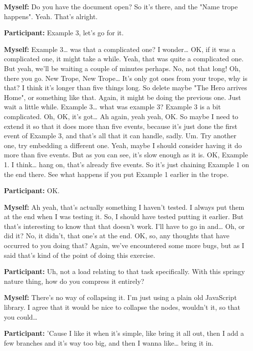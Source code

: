 \documentclass[11pt]{report}
\newcommand{\llabel}[1]{\hypertarget{llineno:#1}{\linelabel{#1}}}
\begin{document}
\begin{linenumbers}
\textbf{Myself:} Do you have the document open? So it's there, and the "Name trope happens". Yeah. That's alright.

\textbf{Participant:} Example 3, let's go for it.

\textbf{Myself:} Example 3\ldots{} was that a complicated one? I wonder\ldots{} OK, if it was a complicated one, it might take a while. Yeah, that was quite a complicated one. But yeah, we'll be waiting a couple of minutes perhaps. No, not that long! Oh, there you go. New Trope, New Trope\ldots{} It's only got ones from your trope, why is that? I think it's longer than five things long. So delete maybe "The Hero arrives Home", or something like that. Again, it might be doing the previous one. Just wait a little while. Example 3\ldots{} what was example 3? Example 3 is a bit complicated. Oh, OK, it's got\ldots{} Ah again, yeah yeah, OK. So maybe I need to extend it so that it does more than five events, because it's just done the first event of Example 3, and that's all that it can handle, sadly. Um. Try another one, try embedding a different one. Yeah, maybe I should consider having it do more than five events. But as you can see, it's slow enough as it is. OK, Example 1. I think\ldots{} hang on, that's already five events. So it's just chaining Example 1 on the end there. See what happens if you put Example 1 earlier in the trope.

\textbf{Participant:} OK.

\textbf{Myself:} Ah yeah, that's actually something I haven't tested. I always
put them at the end when I was testing it. So, I should have tested putting it
earlier. But that's interesting to know that that doesn't work. I'll have to go
in and\ldots{} Oh, or did it? No, it didn't, that one's at the end. OK, so, any
thoughts that have occurred to you doing that? Again, we've encountered some
more bugs, but as I said that's kind of the point of doing this
exercise.\llabel{lne:bug3a}

\textbf{Participant:} Uh, not a load relating to that task specifically. With this springy nature thing, how do you compress it entirely?

\textbf{Myself:} There's no way of collapsing it. I'm just using a plain old JavaScript library. I agree that it would be nice to collapse the nodes, wouldn't it, so that you could\ldots{}

\textbf{Participant:} 'Cause I like it when it's simple, like bring it all out, then I add a few branches and it's way too big, and then I wanna like\ldots{} bring it in.


\end{linenumbers}
\end{document}
